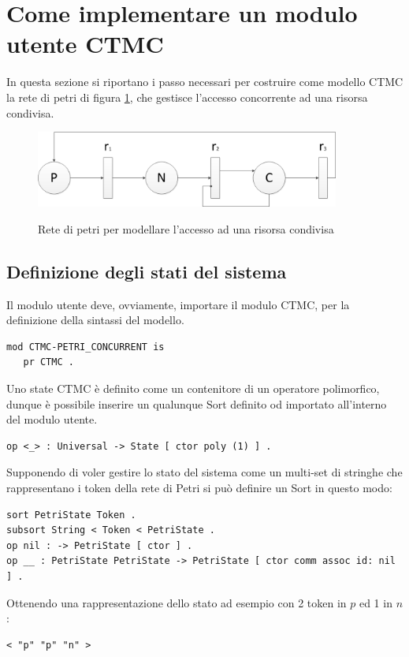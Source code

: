 \section{Come implementare un modulo utente CTMC}

In questa sezione si riportano i passo necessari per costruire come modello CTMC
la rete di petri di figura \ref{petri1}, che gestisce l'accesso concorrente ad
una risorsa condivisa.

\begin{figure}[!hb]
	\includegraphics[width=10cm]{../resources/images/petri1.png}
	\label{petri1}
	\caption{Rete di petri per modellare l'accesso ad una risorsa condivisa}
\end{figure}

\subsection{Definizione degli stati del sistema}

Il modulo utente deve, ovviamente, importare il modulo CTMC, per la definizione
della sintassi del modello.
\begin{Verbatim}[fontsize=\small]
mod CTMC-PETRI_CONCURRENT is
   pr CTMC .
\end{Verbatim}

Uno state CTMC è definito come un contenitore di un operatore polimorfico,
dunque è possibile inserire un qualunque Sort definito od importato all'interno
del modulo utente.
\begin{Verbatim}[fontsize=\small]
op <_> : Universal -> State [ ctor poly (1) ] .
\end{Verbatim}
Supponendo di voler gestire lo stato del sistema come un multi-set di stringhe
che rappresentano i token della rete di Petri si può definire un Sort in questo
modo:
\begin{Verbatim}[fontsize=\small]
sort PetriState Token .
subsort String < Token < PetriState .
op nil : -> PetriState [ ctor ] .
op __ : PetriState PetriState -> PetriState [ ctor comm assoc id: nil ] .
\end{Verbatim}
Ottenendo una rappresentazione dello stato ad esempio con 2 token in $p$ ed 1 in
$n$:
\begin{Verbatim}[fontsize=\small]
< "p" "p" "n" >
\end{Verbatim}

